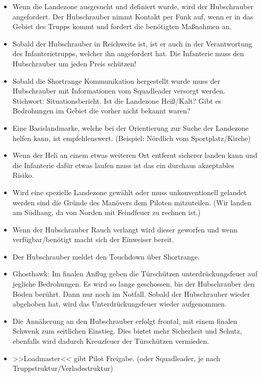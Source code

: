  	\begin{itemize} 
		\item Wenn die Landezone ausgesucht und definiert wurde, wird der Hubschrauber angefordert. Der Hubschrauber nimmt Kontakt per Funk auf, wenn er in das Gebiet des Trupps kommt und fordert die benötigten Maßnahmen an.

		\item Sobald der Hubschrauber in Reichweite ist, ist er auch in der Verantwortung des Infanterietrupps, welcher ihn angefordert hat. Die Infanterie muss den Hubschrauber um jeden Preis schützen!

		\item Sobald die Shortrange Kommunikation hergestellt wurde muss der Hubschrauber mit Informationen vom Squadleader versorgt werden. Stichwort: Situationsbericht. Ist die Landezone Heiß/Kalt? Gibt es Bedrohungen im Gebiet die vorher nicht bekannt waren?

		\item Eine Basislandmarke, welche bei der Orientierung zur Suche der Landezone helfen kann, ist empfehlenswert. (Beispiel: Nördlich vom Sportplatz/Kirche)

		\item Wenn der Heli an einem etwas weiteren Ort entfernt sicherer landen kann und die Infanterie dafür etwas laufen muss ist das ein durchaus akzeptables Risiko.

		\item Wird eine spezielle Landezone gewählt oder muss unkonventionell gelandet werden sind die Gründe des Manövers dem Piloten mitzuteilen. (Wir landen am Südhang, da von Norden mit Feindfeuer zu rechnen ist.)

		\item Wenn der Hubschrauber Rauch verlangt wird dieser geworfen und wenn verfügbar/benötigt macht sich der Einweiser bereit.

		\item Der Hubschrauber meldet den Touchdown über Shortrange.

		\item Ghosthawk: Im finalen Anflug geben die Türschützen unterdrückungsfeuer auf jegliche Bedrohungen. Es wird so lange geschossen, bis der Hubschrauber den Boden berührt. Dann nur noch im Notfall. Sobald der Hubschrauber wieder abgehoben hat, wird das Unterdrückungsfeuer wieder aufgenommen.

		\item Die Annäherung an den Hubschrauber erfolgt frontal, mit einem finalen Schwenk zum seitlichen Einstieg. Dies bietet mehr Sicherheit und Schutz, ebenfalls wird dadurch Kreuzfeuer der Türschützen vermieden.

		\item >>Loadmaster<< gibt Pilot Freigabe. (oder Squadleader, je nach Truppstruktur/Verladestruktur)
	\end{itemize}

